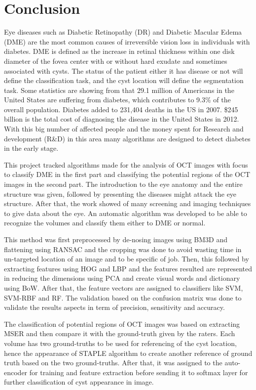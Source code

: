 \chapter{Conclusion} \label{chap:conclusion}
Eye diseases such as Diabetic Retinopathy (DR) and Diabetic Macular Edema (DME) are the most common causes of irreversible vision loss in individuals with diabetes.
DME is defined as the increase in retinal thickness within one disk diameter of the fovea center with or without hard exudate and sometimes associated with cysts.
The status of the patient either it has disease or not will define the classification task, and the cyst location will define the segmentation task.
Some statistics are showing from \cite{national1995diabetes} that 29.1 million of Americans in the United States are suffering from diabetes, which contributes to 9.3\% of the overall population.
Diabetes added to 231,404 deaths in the US in 2007.
\$245 billion is the total cost of diagnosing the disease in the United States in 2012.
With this big number of affected people and the money spent for Research and development (R\&D) in this area many algorithms are designed to detect diabetes in the early stage.

This project tracked algorithms made for the analysis of OCT images with focus to classify DME in the first part and classifying the potential regions of the OCT images in the second part.
The introduction to the eye anatomy and the entire structure was given, followed by presenting the diseases might attack the eye structure. 
After that, the work showed of many screening and imaging techniques to give data about the eye.
An automatic algorithm was developed to be able to recognize the volumes and classify them either to DME or normal.

This method was first preprocessed by de-nosing images using BM3D and flattening using RANSAC and the cropping was done to avoid wasting time in un-targeted location of an image and to be specific of job.
Then, this followed by extracting features using HOG and LBP and the features resulted are represented in reducing the dimensions using PCA and create visual words and dictionary using BoW.
After that, the feature vectors are assigned to classifiers like SVM, SVM-RBF and RF. 
The validation based on the confusion matrix was done to validate the results aspects in term of precision, sensitivity and accuracy.

The classification of potential regions of OCT images was based on extracting MSER and then compare it with the ground-truth given by the raters.
Each volume has two ground-truths to be used for referencing of the cyst location, hence the appearance of STAPLE algorithm to create another reference of ground truth based on the two ground-truths.
After that, it was assigned to the auto-encoder for training and feature extraction before sending it to softmax layer for further classification of cyst appearance in image.  

